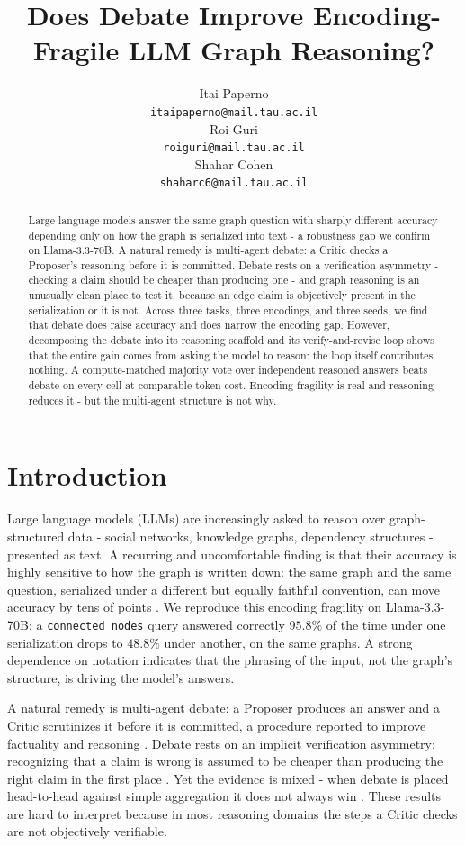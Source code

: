 \documentclass[11pt]{article}
\title{Does Debate Improve Encoding-Fragile LLM Graph Reasoning?}
\author{Itai Paperno \\
  \texttt{itaipaperno@mail.tau.ac.il} \\\And
  Roi Guri \\
  \texttt{roiguri@mail.tau.ac.il} \\\And
  Shahar Cohen \\
  \texttt{shaharc6@mail.tau.ac.il} \\}
\begin{document}
\maketitle

\begin{abstract}
Large language models answer the same graph question with sharply different
accuracy depending only on how the graph is serialized into text - a robustness
gap we confirm on Llama-3.3-70B. A natural remedy is multi-agent
debate: a Critic checks a Proposer's reasoning before it is committed.
Debate rests on a verification asymmetry - checking a claim should be
cheaper than producing one - and graph reasoning is an unusually clean place to
test it, because an edge claim is objectively present in the serialization or it
is not. Across three tasks, three encodings, and three seeds, we find that debate
does raise accuracy and does narrow the encoding gap. However, decomposing the
debate into its reasoning scaffold and its verify-and-revise loop shows that the
entire gain comes from asking the model to reason: the loop itself contributes
nothing. A compute-matched majority vote over independent reasoned answers beats
debate on every cell at comparable token cost. Encoding fragility is real and
reasoning reduces it - but the multi-agent structure is not why.
\end{abstract}

\section{Introduction}

Large language models (LLMs) are increasingly asked to reason over graph-structured
data - social networks, knowledge graphs, dependency structures - presented as
text. A recurring and uncomfortable finding is that their accuracy is highly
sensitive to how the graph is written down: the same graph and the same
question, serialized under a different but equally faithful convention, can move
accuracy by tens of points \citep{fatemi2024talk}. We reproduce this
encoding fragility on Llama-3.3-70B: a
\texttt{connected\_nodes} query answered correctly $95.8\%$ of the time under one
serialization drops to $48.8\%$ under another, on the same graphs. A strong dependence on notation indicates that the phrasing of the input, not the
graph's structure, is driving the model's answers.

A natural remedy is multi-agent debate: a Proposer produces an answer and a
Critic scrutinizes it before it is committed, a procedure reported to improve
factuality and reasoning \citep{du2023debate}. Debate rests on an implicit
verification asymmetry: recognizing that a claim is wrong is assumed to be
cheaper than producing the right claim in the first place \citep{irving2018debate}.
Yet the evidence is mixed - when debate is placed head-to-head against simple
aggregation it does not always win \citep{choi2025debateorvote}. These results are hard to
interpret because in most reasoning domains the steps a Critic checks are not
objectively verifiable.
\end{document}
